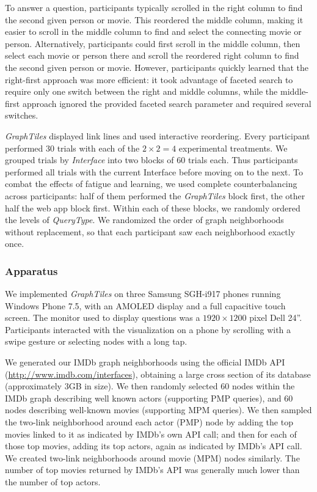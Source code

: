 To answer a question, participants typically scrolled in the right column to find the second given person or movie. This reordered the middle column, making it easier to scroll in the middle column to find and select the connecting movie or person. Alternatively, participants could first scroll in the middle column, then select each movie or person there and scroll the reordered right column to find the second given person or movie. However, participants quickly learned that the right-first approach was more efficient: it took advantage of faceted search to require only one switch between the right and middle columns, while the middle-first approach ignored the provided faceted search parameter and required several switches.

\textit{GraphTiles} displayed link lines and used interactive reordering. Every participant performed $30$ trials with each of the $2 \times 2 = 4$ experimental treatments. We grouped trials by \textit{Interface} into two blocks of $60$ trials each. Thus participants performed all trials with the current Interface before moving on to the next. To combat the effects of fatigue and learning, we used complete counterbalancing across participants: half of them performed the \textit{GraphTiles} block first, the other half the web app block first. Within each of these blocks, we randomly ordered the levels of \textit{QueryType}. We randomized the order of graph neighborhoods without replacement, so that each participant saw each neighborhood exactly once.

\subsubsection{Apparatus}

We implemented \textit{GraphTiles} on three Samsung SGH-i917 phones running Windows Phone 7.5, with an AMOLED display and a full capacitive touch screen. The monitor used to display questions was a $1920 \times 1200$ pixel Dell 24''. Participants interacted with the visualization on a phone by scrolling with a swipe gesture or selecting nodes with a long tap.

We generated our IMDb graph neighborhoods using the official IMDb API (\url{http://www.imdb.com/interfaces}), obtaining a large cross section of its database (approximately 3GB in size). We then randomly selected 60 nodes within the IMDb graph describing well known actors (supporting PMP queries), and 60 nodes describing well-known movies (supporting MPM queries). We then sampled the two-link neighborhood around each actor (PMP) node by adding the top movies linked to it as indicated by IMDb's own API call; and then for each of those top movies, adding its top actors, again as indicated by IMDb's API call. We created two-link neighborhoods around movie (MPM) nodes similarly. The number of top movies returned by IMDb's API was generally much lower than the number of top actors. 


